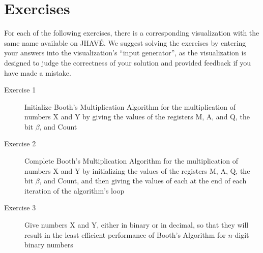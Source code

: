 \documentclass{article}
\begin{document}
\section{Exercises}
For each of the following exercises, there is a corresponding visualization with the same name available on JHAVÉ.
We suggest solving the exercises by entering your answers into the visualization's ``input generator'', as the visualization is designed to judge the correctness of your solution and provided feedback if you have made a mistake.

\begin{description}
    \item [Exercise 1] Initialize Booth's Multiplication Algorithm for the multiplication of numbers X and Y by giving the values of the registers M, A, and Q, the bit $\beta$, and Count
    \item [Exercise 2] Complete Booth's Multiplication Algorithm for the multiplication of numbers X and Y by initializing the values of the registers M, A, Q, the bit $\beta$, and Count, and then giving the values of each at the end of each iteration of the algorithm's loop
    \item [Exercise 3] Give numbers X and Y, either in binary or in decimal, so that they will result in the least efficient performance of Booth's Algorithm for $n$-digit binary numbers
\end{description}

\end{document}
